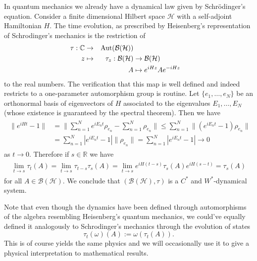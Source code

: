 \begin{example}\label{ex:schrodinger}
In quantum mechanics we already have a dynamical law given by Schrödinger's equation. Consider a finite dimensional Hilbert space $\mathcal{H}$ with a self-adjoint Hamiltonian $H$. The time evolution, as prescribed by Heisenberg's representation of Schrodinger's mechanics is the restriction of
\begin{alignat}{2}
\tau:\mathbb{C}&\rightarrow&\operatorname{Aut}(\mathcal{B}(\mathcal{H})) \nonumber \\
z&\mapsto&\tau_z:\mathcal{B}(\mathcal{H})&\rightarrow\mathcal{B}(\mathcal{H}) \\
&&A&\mapsto e^{iHz}Ae^{-iHz} \nonumber
\end{alignat}
to the real numbers. The verification that this map is well defined and indeed restricts to a one-parameter automorphism group is routine.
Let $\{e_1,\dots,e_N\}$ be an orthonormal basis of eigenvectors of $H$ associated to the eigenvalues $E_1,\dots,E_N$ (whose existence is guaranteed by the spectral theorem). Then we have
\begin{align}
\begin{split}
\|e^{iHt}-1\|&=\|\sum_{n=1}^Ne^{iE_nt}\rho_{e_n}-\sum_{n=1}^N \rho_{e_n}\|\leq\sum_{n=1}^N \|\left(e^{iE_nt}-1\right)\rho_{e_n}\| \\
&= \sum_{n=1}^N|e^{iE_nt}-1|\|\rho_{e_n}\|=\sum_{n=1}^N|e^{iE_nt}-1|\rightarrow 0
\end{split}
\end{align}
as $t\rightarrow 0$. Therefore if $s\in\mathbb{R}$ we have
\begin{align}
\begin{split}
\lim_{t\rightarrow s}\tau_t(A)=\lim_{t\rightarrow s}\tau_{t-s}\tau_s(A)=\lim_{t\rightarrow s}e^{iH(t-s)}\tau_s(A)e^{iH(s-t)}=\tau_s(A)
\end{split}
\end{align}
for all $A\in \mathcal{B}(\mathcal{H})$. We conclude that $(\mathcal{B}(\mathcal{H}),\tau)$ is a $C^*$ and $W^*$-dynamical system.
\end{example} 

Note that even though the dynamics have been defined through automorphisms of the algebra resembling Heisenberg's quantum mechanics, we could've equally defined it analogously to Schrodinger's mechanics through the evolution of states
\begin{equation}
\tau_t(\omega)(A):=\omega(\tau_t(A)).
\end{equation}
This is of course yields the same physics and we will occasionally use it to give a physical interpretation to mathematical results. 

